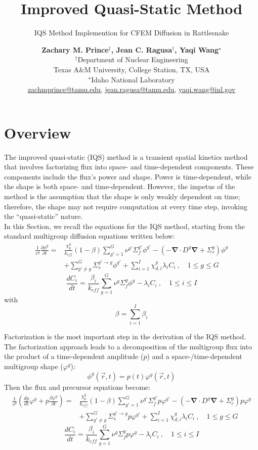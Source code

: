 \documentclass[10pt]{scrartcl}
\title{Improved Quasi-Static Method}
\subtitle{IQS Method Implemention for CFEM Diffusion in Rattlesnake}
\author{ \normalsize
  \textbf{Zachary M. Prince$^\dagger$, Jean C. Ragusa$^\dagger$, Yaqi Wang$^\star$} \\
\normalsize $^\dagger$Department of Nuclear Engineering \\
 \normalsize Texas A\&M University, College Station, TX, USA\\
 \normalsize $^\star$Idaho National Laboratory\\
 \normalsize \href{mailto:zachmprince@tamu.edu}{zachmprince@tamu.edu}, \href{jean.ragusa@tamu.edu}{jean.ragusa@tamu.edu}, \href{yaqi.wang@inl.gov}{yaqi.wang@inl.gov} 
}
\renewcommand{\div}{\bs{\nabla}\! \cdot \!}
\newcommand{\grad}{\bs{\nabla}}
\newcommand{\bs}[1]{\mathbf{#1}}
\newcommand{\keff}{k_\textit{eff}}
\newcommand{\be}{\begin{equation}}
\newcommand{\ee}{\end{equation}}
\begin{document}
\maketitle
{}

\section{Overview}

\par
The improved quasi-static (IQS) method is a transient spatial kinetics method that involves factorizing flux into space- and time-dependent components.  These components include the flux's power and shape. Power is time-dependent, while the shape is both space- and time-dependent.  However, the impetus of the method is the assumption that the shape is only weakly dependent on time; therefore, the shape may not require computation at every time step, invoking the “quasi-static” nature.
\\ 

In this Section, we recall the equations for the IQS method, starting from the standard multigroup diffusion equations written below:
\begin{align}
\frac{1}{v^g} \frac{\partial \phi^g }{\partial t} =& \frac{\chi_p^g}{\keff} (1-\beta)\sum_{g'=1}^G  \nu^{g'} \Sigma_f^{g'} \phi^{g'} -  \left( -\div D^g \grad  + \Sigma_r^g \right) \phi^g  \nonumber \\
&  + \sum_{g'\neq g}^G\Sigma_s^{g'\to g} \phi^{g'}  + \sum_{i=1}^I\chi_{d,i}^g\lambda_i C_i \ , \quad 1 \le g \le G 
\label{eq:flux}
\end{align}
\be
\frac{dC_i}{dt} = \frac{\beta_i}{k_{eff}}\sum_{g=1}^G\nu^{g} \Sigma_f^g \phi^{g} - \lambda_i C_i \ , \quad 1 \le i \le I 
\label{eq:precursor}
\ee
with
\be
\beta = \sum_{i=1}^I \beta_{i} 
\ee

Factorization is the most important step in the derivation of the IQS method. The factorization approach leads to a decomposition of the multigroup flux into the product of a time-dependent amplitude ($p$) and a space-/time-dependent multigroup shape ($\varphi^g$):
\be
\phi^g(\vec{r},t)=p(t)\varphi^g(\vec{r},t)
\ee
Then the flux and precursor equations become:
\begin{align}
\frac{1}{v^g}\left(\frac{dp}{dt}\varphi^g + p\frac{\partial \varphi^g}{\partial t}\right) =&\frac{\chi_p^g}{k_{eff}}(1-\beta) \sum_{g'=1}^G  \nu^{g'} \Sigma_f^{g'} p \varphi^{g'} - \left( -\div D^g \grad  + \Sigma_r^g \right)p \varphi^g \nonumber \\
&  + \sum_{g'\neq g}^G\Sigma_s^{g'\to g} p \varphi^{g'}  + \sum_{i=1}^I\chi_{d,i}^g\lambda_i C_i \ , \quad 1 \le g \le G 
\label{eq:shape}
\end{align}
\be
\frac{dC_i}{dt} = \frac{\beta_i}{k_{eff}}\sum_{g=1}^G\nu^{g} \Sigma_f^g p \varphi^{g} - \lambda_i C_i \ , \quad 1 \le i \le I 
\label{eq:prec}
\ee
\end{document}
